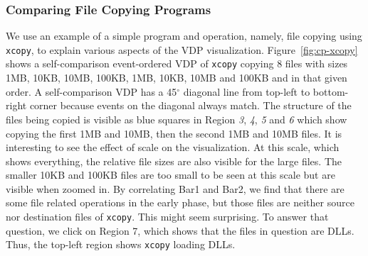 \subsubsection{Comparing File Copying Programs}
\label{sec:cp}



We use an example of a simple program and operation,
namely, file copying using {\tt xcopy}, to explain various
aspects of the VDP visualization.
Figure~\ref{fig:cp-xcopy} shows a self-comparison event-ordered VDP of
{\tt xcopy} copying 8 files with sizes
1MB, 10KB, 10MB, 100KB, 1MB, 10KB, 10MB and 100KB and in that given order.
A self-comparison VDP has a 45$^\circ$ diagonal line from top-left to 
bottom-right corner because events on the diagonal always match.
The structure of the files being copied is visible as blue squares in
Region {\em 3}, {\em 4}, {\em 5} and {\em 6} which show copying the
first 1MB and 10MB, then the second 1MB and 10MB files.
It is interesting to see the effect of scale on the visualization.
At this scale, which shows everything, the relative file sizes are also
visible for the large files.  The smaller 10KB and 100KB files are 
too small to be seen at this scale but are visible when zoomed in.
By correlating Bar1 and Bar2,
we find that there are some file related operations in the early phase,
but those files are neither source nor destination files of {\tt xcopy}.
This might seem surprising. To answer that question, we
click on Region 7, which shows that
the files in question are DLLs. Thus, the top-left region 
shows {\tt xcopy} loading DLLs.

